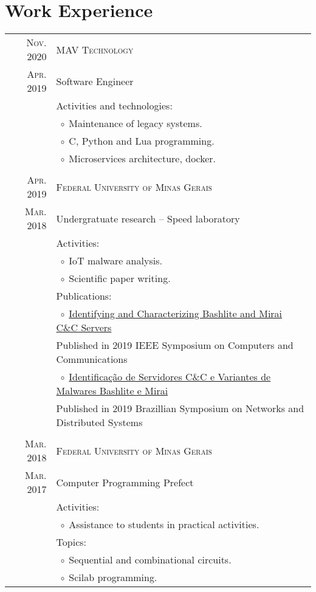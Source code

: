 \documentclass[a4paper,10pt]{article}
\newcommand{\tabitem}{$\;\circ\;$}
\newcommand{\cpp}{C\protect\scalebox{0.8}{\protect\raisebox{0.4ex}{++}}}
\renewcommand\#{\protect\scalebox{0.8}{\protect\raisebox{0.4ex}{\char"0023}}}
\begin{document}
\section{Work Experience}
\begin{tabular}{r|p{12.3cm}}
  \textsc{Nov. 2020} & \textsc{MAV Technology} \\
  \textsc{Apr. 2019} & Software Engineer \\[5pt]
  & Activities and technologies: \\
  & \tabitem Maintenance of legacy systems. \\
  & \tabitem \cpp, Python and Lua programming. \\
  & \tabitem Microservices architecture, docker. \\

  \multicolumn{2}{c}{} \\
  \textsc{Apr. 2019} & \textsc{Federal University of Minas Gerais} \\
  \textsc{Mar. 2018} & Undergratuate research -- Speed laboratory \\[5pt]
  & Activities: \\
  & \tabitem IoT malware analysis. \\
  & \tabitem Scientific paper writing. \\
  & Publications: \\
  & \tabitem \href{https://doi.org/10.1109/ISCC47284.2019.8969728}{Identifying and Characterizing Bashlite and Mirai C\&C Servers} \\
  & \phantom{\tabitem}Published in 2019 IEEE Symposium on Computers and Communications \\
  & \tabitem \href{https://doi.org/10.5753/sbrc.2019.7398}{Identificação de Servidores C\&C e Variantes de Malwares Bashlite e Mirai} \\
  & \phantom{\tabitem}Published in 2019 Brazillian Symposium on Networks and Distributed Systems \\

  \multicolumn{2}{c}{} \\
  \textsc{Mar. 2018} & \textsc{Federal University of Minas Gerais} \\
  \textsc{Mar. 2017} & Computer Programming Prefect \\[5pt]
  & Activities: \\
  & \tabitem Assistance to students in practical activities. \\
  & Topics: \\
  & \tabitem Sequential and combinational circuits. \\
  & \tabitem Scilab programming. \\
  

\end{tabular}
\end{document}
